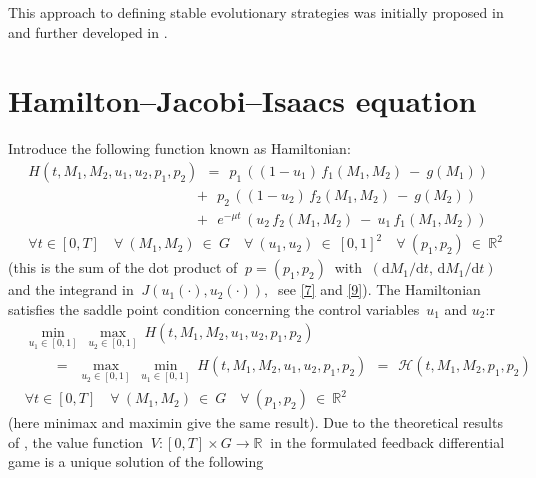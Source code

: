 \documentclass[11pt]{amsart}
\begin{document}
This approach to defining stable evolutionary strategies was initially proposed in \cite{BernhardGrognardMailleretAkhmetzhanov2010}
and further developed in \cite{YegorovGrognardMailleretHalkettBernhard2019}.


\section{Hamilton--Jacobi--Isaacs equation}

Introduce the following function known as Hamiltonian:
\begin{equation}
\begin{aligned}
& H(t, M_1, M_2, u_1, u_2, p_1, p_2) \:\: = \:\:
p_1 \, ((1 - u_1) \, f_1(M_1, M_2) \: - \: g(M_1)) \\
& \qquad\qquad\qquad\qquad\qquad\quad \:\:\:\,
+ \:\: p_2 \, ((1 - u_2) \, f_2(M_1, M_2) \: - \: g(M_2)) \\
& \qquad\qquad\qquad\qquad\qquad\quad \:\:\:\,
+ \:\: e^{-\mu t} \, (u_2 \, f_2(M_1, M_2) \: - \: u_1 \, f_1(M_1, M_2)) \\
& \forall t \in [0, T] \quad \forall \: (M_1, M_2) \: \in \: G \quad \forall \: (u_1, u_2) \: \in \: [0, 1]^2 \quad
\forall \: (p_1, p_2) \: \in \: \mathbb{R}^2
\end{aligned}  \label{12}
\end{equation}
(this is the sum of the dot product of $ \: p = (p_1, p_2) \: $ with
$ \: (\mathrm{d} M_1 / \mathrm{d} t, \, \mathrm{d} M_1 / \mathrm{d} t) \: $ and the integrand in $ \: J(u_1(\cdot), u_2(\cdot)), \: $
see \cref{7} and \cref{9}). The Hamiltonian satisfies the saddle point condition concerning the control variables~$ u_1 $ and
$ u_2 $:r
\begin{equation}
\begin{aligned}
& \min_{u_1 \in [0, 1]} \: \max_{u_2 \in [0, 1]} \: H(t, M_1, M_2, u_1, u_2, p_1, p_2) \\
& \qquad
= \:\: \max_{u_2 \in [0, 1]} \: \min_{u_1 \in [0, 1]} \: H(t, M_1, M_2, u_1, u_2, p_1, p_2) \:\:
= \:\: \mathcal{H} (t, M_1, M_2, p_1, p_2) \\
& \forall t \in [0, T] \quad \forall \: (M_1, M_2) \: \in \: G \quad \forall \: (p_1, p_2) \: \in \: \mathbb{R}^2
\end{aligned}  \label{13}
\end{equation}
(here minimax and maximin give the same result). Due to the theoretical results of \cite[\S XI.6]{FlemingSoner2006}, the value function
$ \: V \colon [0, T] \times G \to \mathbb{R} \: $ in the formulated feedback differential game is a unique solution of the following
\end{document}

